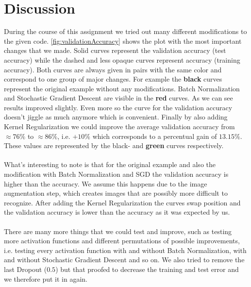 \documentclass{article}
\begin{document}
	\section{Discussion}
	\label{sec:Discussion}
	During the course of this assignment we tried out many different modifications to the given code. \autoref{fig:validationAccuracy} shows the plot with the most important changes that we made. Solid curves represent the validation accuracy (test accuracy) while the dashed and less opaque curves represent accuracy (training accuracy). Both curves are always given in pairs with the same color and correspond to one group of major changes. For example the \textbf{black} curves represent the original example without any modifications. Batch Normalization and Stochastic Gradient Descent are visible in the \textbf{red} curves. As we can see results improved slightly. Even more so the curve for the validation accuracy doesn't jiggle as much anymore which is convenient. Finally by also adding Kernel Regularization we could improve the average validation accuracy from $\approx76\%$ to $\approx86\%$, i.e. $+10\%$ which corresponds to a percentual gain of $13.15\%$. These values are represented by the black- and \textbf{green} curves respectively. \\
	\\
	What's interesting to note is that for the original example and also the modification with Batch Normalization and SGD the validation accuracy is higher than the accuracy. We assume this happens due to the image augmentation step, which creates images that are possibly more difficult to recognize. After adding the Kernel Regularization the curves swap position and the validation accuracy is lower than the accuracy as it was expected by us. \\
	\\
	There are many more things that we could test and improve, such as testing more activation functions and different permutations of possible improvements, i.e. testing every activation function with and without Batch Normalization, with and without Stochastic Gradient Descent and so on. We also tried to remove the last Dropout ($0.5$) but that proofed to decrease the training and test error and we therefore put it in again. 

	
	
\end{document}
